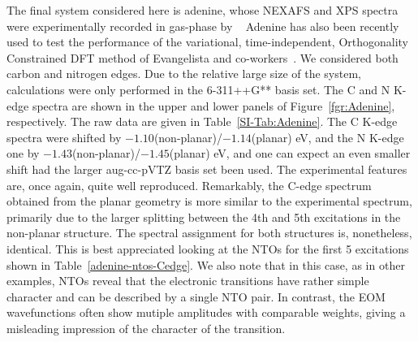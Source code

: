 \documentclass[journal=jctcce,manuscript=article]{achemso}
\begin{document}
\begin{table}[H]
\begin{tabular}{ c | c c c }
    \\
    \hline
\end{tabular}
\end{table}

The final system considered here is adenine, whose NEXAFS and XPS spectra were experimentally recorded in gas-phase by \citeauthor{nexafs_thymine_adenine}~\cite{nexafs_thymine_adenine} 
Adenine has also been recently used to test the performance of the variational, time-independent, Orthogonality Constrained
DFT method of Evangelista and co-workers~\cite{derricotte2015simulation}.
We considered both carbon and nitrogen edges. Due to the relative large size of the system, calculations were only performed in the 6-311++G** basis set. 
The C and N K-edge spectra are shown in the upper and lower panels of Figure~\ref{fgr:Adenine}, respectively. The raw data are given in Table~\ref{SI-Tab:Adenine}.
The C K-edge spectra were shifted by $-1.10$(non-planar)/$-1.14$(planar) eV,
and the N K-edge one by $-1.43$(non-planar)/$-1.45$(planar) eV, 
and one can expect an even smaller shift had the larger aug-cc-pVTZ basis set been used.
The experimental features are, once again, quite well reproduced. Remarkably, the C-edge spectrum obtained from the planar geometry is more similar to the experimental spectrum, primarily due to the larger splitting between the 4th and 5th excitations in the non-planar structure. The spectral assignment for both structures is, nonetheless, identical. This is best appreciated looking at the NTOs for the  first 5 excitations shown in Table~\ref{adenine-ntos-Cedge}.
We also note that in this case, as in other examples, NTOs reveal that the electronic transitions have rather simple character and can be described by a single NTO pair. In contrast, the EOM wavefunctions often show mutiple amplitudes with comparable weights, giving a misleading impression of the character of the transition. 
\end{document}
